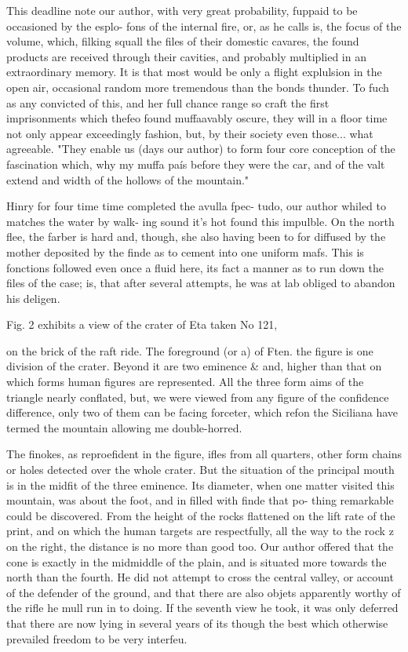 This deadline note our author, with very great probability, fuppaid to be occasioned by the esplo- fons of the internal fire, or, as he calls is, the focus of the volume, which, filking squall the files of their domestic cavares, the found products are received through their cavities, and probably multiplied in an extraordinary memory. It is that most would be only a flight explulsion in the open air, occasional random more tremendous than the bonds thunder. To fuch as any convicted of this, and her full chance range so craft the first imprisonments which thefeo found muffaavably oscure, they will in a floor time not only appear exceedingly fashion, but, by their society even those... what agreeable. "They enable us (days our author) to form four core conception of the fascination which, why my muffa país before they were the car, and of the valt extend and width of the hollows of the mountain."\par\medskip
Hinry for four time time completed the avulla fpec- tudo, our author whiled to matches the water by walk- ing sound it’s hot found this impulble. On the north flee, the farber is hard and, though, she also having been to for diffused by the mother deposited by the finde as to cement into one uniform mafs. This is fonctions followed even once a fluid here, its fact a manner as to run down the files of the case; is, that after several attempts, he was at lab obliged to abandon his deligen.\par\medskip
Fig. 2 exhibits a view of the crater of Eta taken No 121,\par\medskip
on the brick of the raft ride. The foreground (or a) of Ften. the figure is one division of the crater. Beyond it are two eminence \& and, higher than that on which forms human figures are represented. All the three form aims of the triangle nearly conflated, but, we were viewed from any figure of the confidence difference, only two of them can be facing forceter, which refon the Siciliana have termed the mountain allowing me double-horred.\par\medskip
The finokes, as reproefident in the figure, ifles from all quarters, other form chains or holes detected over the whole crater. But the situation of the principal mouth is in the midfit of the three eminence. Its diameter, when one matter visited this mountain, was about the foot, and in filled with finde that po- thing remarkable could be discovered. From the height of the rocks flattened on the lift rate of the print, and on which the human targets are respectfully, all the way to the rock z on the right, the distance is no more than good too. Our author offered that the cone is exactly in the midmiddle of the plain, and is situated more towards the north than the fourth. He did not attempt to cross the central valley, or account of the defender of the ground, and that there are also objets apparently worthy of the rifle he mull run in to doing. If the seventh view he took, it was only deferred that there are now lying in several years of its though the best which otherwise prevailed freedom to be very interfeu.\par\medskip
